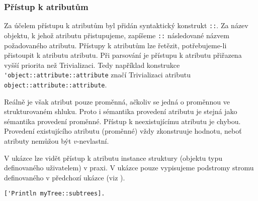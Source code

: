 \subsubsection{Přístup k atributům}

Za účelem přístupu k atributům byl přidán syntaktický konstrukt \lstinline{::}. Za název objektu,
k jehož atributu přistupujeme, zapíšeme \lstinline{::} následované názvem požadovaného atributu.
Přístupy k atributům lze řetězit, potřebujeme-li přistoupit k atributu atributu. Při parsování
je přístupu k atributu přiřazena vyšší priorita než Trivializaci. Tedy například konstrukce
\lstinline{'object::attribute::attribute} značí Trivializaci atributu
\lstinline{object::attribute::attribute}.

Reálně je však atribut pouze proměnná, ačkoliv se jedná o proměnnou ve strukturovaném shluku.
Proto i sémantika provedení atributu je stejná jako sémantika provedení proměnné. Přístup
k neexistujícímu atributu je chybou. Provedení existujícího atributu (proměnné) vždy zkonstruuje
hodnotu, neboť atributy nemůžou být $v$-nevlastní.

V ukázce  lze vidět přístup k atributu instance struktury (objektu
typu definovaného uživatelem) v praxi. V ukázce pouze vypisujeme podstromy stromu definovaného
v předchozí ukázce (viz ).

\begin{lstlisting}[caption={Příklad přístupu k atributům objektu},label=struct-attr-access]
['Println myTree::subtrees].
\end{lstlisting}

\endinput
